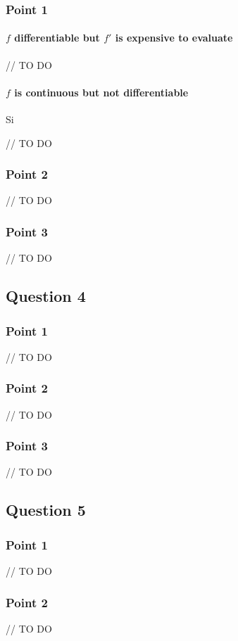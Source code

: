 \subsubsection{Point 1}

\paragraph{$f$ differentiable but $f'$ is expensive to evaluate}

// TO DO

\paragraph{$f$ is continuous but not differentiable}

Si 

// TO DO

\subsubsection{Point 2}

// TO DO

\subsubsection{Point 3}

// TO DO

\subsection{Question 4}

\subsubsection{Point 1}

// TO DO

\subsubsection{Point 2}

// TO DO

\subsubsection{Point 3}

// TO DO

\subsection{Question 5}

\subsubsection{Point 1}

// TO DO

\subsubsection{Point 2}

// TO DO